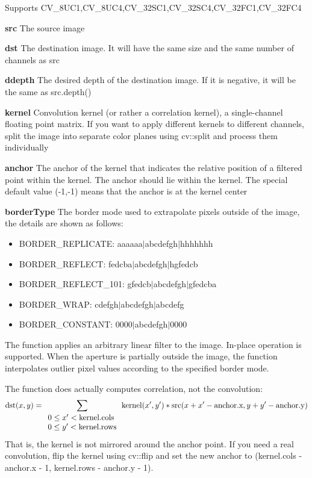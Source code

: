 \documentclass{article}
\begin{document}
Supports CV{\_}8UC1,CV{\_}8UC4,CV{\_}32SC1,CV{\_}32SC4,CV{\_}32FC1,CV{\_}32FC4

\textbf{src }The source image

\textbf{dst }The destination image. It will have the same size and the same
number of channels as src

\textbf{ddepth }The desired depth of the destination image. If it is
negative, it will be the same as src.depth()

\textbf{kernel }Convolution kernel (or rather a correlation kernel), a
single-channel floating point matrix. If you want to apply different kernels
to different channels, split the image into separate color planes using
cv::split and process them individually

\textbf{anchor }The anchor of the kernel that indicates the relative
position of a filtered point within the kernel. The anchor should lie within
the kernel. The special default value (-1,-1) means that the anchor is at
the kernel center

\textbf{borderType }The border mode used to extrapolate pixels outside of
the image, the details are shown as follows:

\begin{itemize}
\item BORDER{\_}REPLICATE: aaaaaa$\vert $abcdefgh$\vert $hhhhhhh
\item BORDER{\_}REFLECT: fedcba$\vert $abcdefgh$\vert $hgfedcb
\item BORDER{\_}REFLECT{\_}101: gfedcb$\vert $abcdefgh$\vert $gfedcba
\item BORDER{\_}WRAP: cdefgh$\vert $abcdefgh$\vert $abcdefg
\item BORDER{\_}CONSTANT: 0000$\vert $abcdefgh$\vert $0000
\end{itemize}

The function applies an arbitrary linear filter to the image. In-place
operation is supported. When the aperture is partially outside the image,
the function interpolates outlier pixel values according to the specified
border mode.

The function does actually computes correlation, not the convolution:
\[
\mbox{dst}(x,y)=\sum\limits_{{\begin{array}{*{20}c}
 {0\le {x}'<\mbox{kernel.cols}} \hfill \\
 {0\le {y}'<\mbox{kernel.rows}} \hfill \\
\end{array} }} {\mbox{kernel}({x}',{y}')\ast
\mbox{src}(x+{x}'-\mbox{anchor.x},y+{y}'-\mbox{anchor.y})}
\]
That is, the kernel is not mirrored around the anchor point. If you need a
real convolution, flip the kernel using cv::flip and set the new anchor to
(kernel.cols - anchor.x - 1, kernel.rows - anchor.y - 1).
\end{document}

